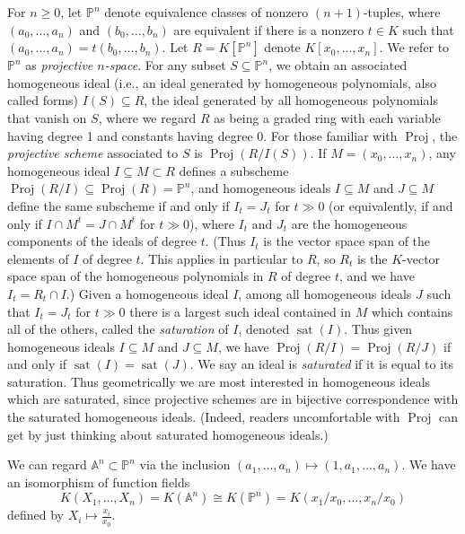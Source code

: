 \documentclass[11pt,twoside]{amsart}
\numberwithin{equation}{section}
\theoremstyle{definition}
\begin{document}
For $n\geq0$, let ${\mathbb{P}^{{n}}}$ denote equivalence classes of nonzero
$(n+1)$-tuples, where $(a_0,\ldots,a_n)$ and $(b_0,\ldots,b_n)$
are equivalent if there is a nonzero $t\in{K}$ such that 
$(a_0,\ldots,a_n)=t(b_0,\ldots,b_n)$. Let $R={K}[{\mathbb{P}^{{n}}}]$ denote ${K}[x_0,\ldots,x_n]$. 
We refer to ${\mathbb{P}^{{n}}}$ as \emph{projective $n$-space}.
For any subset $S\subseteq {\mathbb{P}^{{n}}}$, we obtain an associated homogeneous ideal 
(i.e., an ideal generated by homogeneous polynomials, also called forms)
$I(S)\subseteq R$, the ideal 
generated by all homogeneous polynomials that vanish on $S$, where we regard $R$ as being
a graded ring with each variable having degree 1 and constants having degree 0.
For those familiar with ${\operatorname{Proj}}$,
the \emph{projective scheme} associated to $S$ 
is ${\operatorname{Proj}}(R/I(S))$. If $M=(x_0,\ldots,x_n)$, any homogeneous ideal $I\subseteq M\subset R$ 
defines a subscheme ${\operatorname{Proj}}(R/I)\subseteq {\operatorname{Proj}}(R)={\mathbb{P}^{n}}$, and homogeneous 
ideals $I\subseteq M$ and $J\subseteq M$ define the same subscheme
if and only if $I_t=J_t$ for $t\gg0$ (or equivalently, if and only if
$I\cap M^t=J\cap M^t$ for $t\gg0$), where $I_t$ and $J_t$ are the 
homogeneous components of the ideals of degree $t$. (Thus $I_t$ is the vector 
space span of the elements of $I$ of degree $t$. This applies in particular to $R$,
so $R_t$ is the ${K}$-vector space span of the homogeneous polynomials in 
$R$ of degree $t$, and we have $I_t=R_t\cap I$.) Given a homogeneous ideal 
$I$, among all homogeneous ideals $J$ such that $I_t=J_t$ for $t\gg0$
there is a largest such ideal contained in $M$ which contains all of the others, called the 
\emph{saturation} of $I$, denoted $\operatorname{sat}(I)$. Thus given homogeneous 
ideals $I\subseteq M$ and $J\subseteq M$, we have ${\operatorname{Proj}}(R/I)={\operatorname{Proj}}(R/J)$ if and only if
$\operatorname{sat}(I)=\operatorname{sat}(J)$. We say
an ideal is \emph{saturated} if it is equal to its saturation. Thus geometrically we are most interested in homogeneous ideals which are saturated,
since projective schemes are in bijective 
correspondence with the saturated homogeneous ideals. (Indeed,
readers uncomfortable with ${\operatorname{Proj}}$ can get by just thinking 
about saturated homogeneous ideals.)

We can regard ${\mathbb{A}^{{n}}}\subset{\mathbb{P}^{{n}}}$ via the inclusion 
$(a_1,\ldots,a_n)\mapsto (1,a_1,\ldots,a_n)$.
We have an isomorphism of function fields 
$${K}(X_1,\ldots,X_n)={K}({\mathbb{A}^{{n}}})\cong{K}({\mathbb{P}^{{n}}})={K}(x_1/x_0,\ldots,x_n/x_0)$$
defined by $X_i\mapsto \frac{x_i}{x_0}$.
\end{document}
